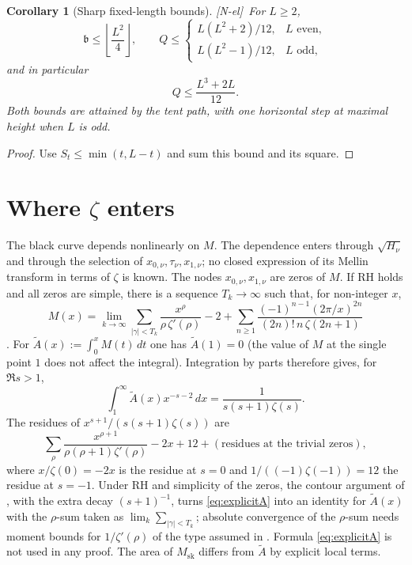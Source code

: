\documentclass[11pt]{amsart}
\numberwithin{equation}{section}
\theoremstyle{plain}
\newtheorem{corollary}[theorem]{Corollary}
\theoremstyle{definition}
\theoremstyle{remark}
\newcommand{\Msk}{M_{\mathrm{sk}}}
\newcommand{\tagNE}{\textup{[N-el]}}
\begin{document}
\begin{corollary}[Sharp fixed-length bounds]
\label{cor:fixed-L}
\tagNE\ For $L\ge2$,
\[
\mathfrak b\le\left\lfloor\frac{L^2}{4}\right\rfloor,\qquad
Q\le
\begin{cases}
L(L^2+2)/12,&L\text{ even},\\
L(L^2-1)/12,&L\text{ odd},
\end{cases}
\]
and in particular
\begin{equation}
\label{eq:Q_upper}
Q\le\frac{L^3+2L}{12}.
\end{equation}
Both bounds are attained by the tent path, with one horizontal step at
maximal height when $L$ is odd.
\end{corollary}

\begin{proof}
Use $S_t\le\min(t,L-t)$ and sum this bound and its square.
\end{proof}


\section{Where \texorpdfstring{$\zeta$}{zeta} enters}
\label{sec:zeta}

The black curve depends nonlinearly on $M$. The dependence enters through
$\sqrt{H_\nu}$ and through the selection of
$x_{0,\nu},\tau_\nu,x_{1,\nu}$; no closed expression of its Mellin transform
in terms of $\zeta$ is known. The nodes
$x_{0,\nu},x_{1,\nu}$ are zeros of $M$. If RH holds and all zeros are
simple, there is a sequence $T_k\to\infty$ such that, for non-integer $x$,
\begin{equation}
\label{eq:explicitM}
  M(x)=\lim_{k\to\infty}\sum_{|\gamma|<T_k}\frac{x^\rho}{\rho\,\zeta'(\rho)}-2
  +\sum_{n\ge1}\frac{(-1)^{n-1}(2\pi/x)^{2n}}{(2n)!\,n\,\zeta(2n+1)}
\end{equation}
\cite[\S14.27]{Titchmarsh1986}. For $\widetilde{A}(x):=\int_0^xM(t)\,dt$ one has
$\widetilde A(1)=0$ (the value of $M$ at the single point $1$ does not
affect the integral).  Integration by parts therefore gives, for
$\Re s>1$,
\begin{equation}
\label{eq:mellin_A}
  \int_1^\infty \widetilde{A}(x)x^{-s-2}\,dx=\frac{1}{s(s+1)\zeta(s)}.
\end{equation}
The residues of $x^{s+1}/(s(s+1)\zeta(s))$ are
\begin{equation}
\label{eq:explicitA}
  \sum_\rho\frac{x^{\rho+1}}{\rho(\rho+1)\zeta'(\rho)}-2x+12
  +(\text{residues at the trivial zeros}),
\end{equation}
where $x/\zeta(0)=-2x$ is the residue at $s=0$ and
$1/((-1)\zeta(-1))=12$ the residue at $s=-1$. Under RH and simplicity of the zeros, the contour argument of
\cite[\S14.27]{Titchmarsh1986}, with the extra decay $(s+1)^{-1}$, turns
\eqref{eq:explicitA} into an identity for $\widetilde A(x)$ with the
$\rho$-sum taken as $\lim_k\sum_{|\gamma|<T_k}$; absolute convergence of
the $\rho$-sum needs moment bounds for $1/\zeta'(\rho)$ of the type assumed
in \cite{Ng2004}. Formula \eqref{eq:explicitA} is not used in any proof. The area of $\Msk$ differs from
$\widetilde A$ by explicit local terms.
\end{document}
